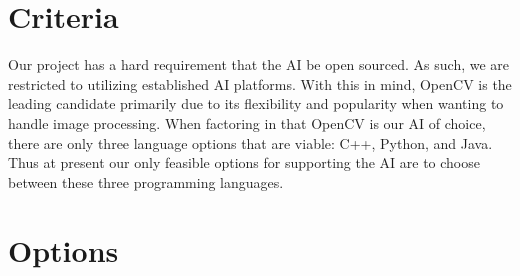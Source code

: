 \documentclass[onecolumn, draftclsnofoot,10pt, compsoc]{IEEEtran}
\begin{document}
\section{Criteria}
Our project has a hard requirement that the AI be open sourced. As such, we are restricted to utilizing established AI platforms. With this in mind, OpenCV is the leading candidate primarily due to its flexibility and popularity when wanting to handle image processing. When factoring in that OpenCV is our AI of choice, there are only three language options that are viable: C++, Python, and Java. Thus at present our only feasible options for supporting the AI are to choose between these three programming languages.
\section{Options}
\end{document}

